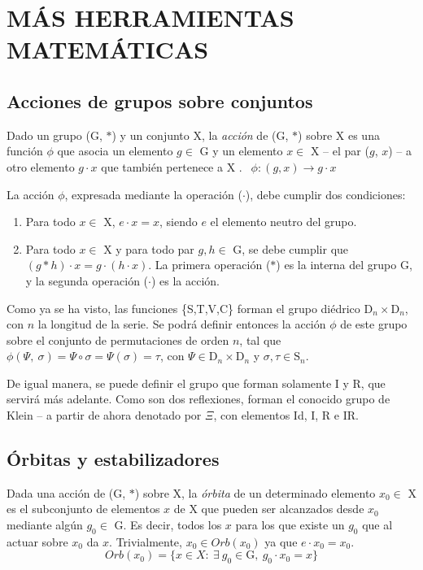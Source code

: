 \section{MÁS HERRAMIENTAS MATEMÁTICAS}\label{ch:acciones}
	\subsection{Acciones de grupos sobre conjuntos}
		Dado un grupo (G, $*$) y un conjunto X, la \emph{acción} de (G, $*$) sobre X es una función $\phi$ que asocia un elemento $g \in$ G y un elemento $x \in$ X -- el par ($g$, $x$) -- a otro elemento $g\cdot x$ que también pertenece a X \cite{armstrong}. $\ \ \phi :(g,x) \to g\cdot x$
	
		La acción $\phi$, expresada mediante la operación ($\cdot$), debe cumplir dos condiciones:
		\begin{enumerate}
			\item{Para todo $x\in$ X, $e\cdot x=x$, siendo $e$ el elemento neutro del grupo.}
		
			\item{Para todo $x\in$ X y para todo par $g,h\in$ G, se debe cumplir que $(g*h)\cdot x=g\cdot (h\cdot x)$. La primera operación ($*$) es la interna del grupo G, y la segunda operación ($\cdot$) es la acción.}
		\end{enumerate}
		Como ya se ha visto, las funciones \{S,T,V,C\} forman el grupo diédrico $\mbox{D}_{n}\times\mbox{D}_{n}$, con $n$ la longitud de la serie. Se podrá definir entonces la acción $\phi$ de este grupo sobre el conjunto de permutaciones de orden $n$, tal que $\phi(\Psi,\ \sigma)=\Psi\circ\sigma=\Psi(\sigma)=\tau$, con $\Psi\in\mbox{D}_{n}\times\mbox{D}_{n}$ y $\sigma,\tau\in\mbox{S}_n$.
		
		De igual manera, se puede definir el grupo que forman solamente I y R, que servirá más adelante. Como son dos reflexiones, forman el conocido grupo de Klein -- a partir de ahora denotado por $\Xi$, con elementos Id, I, R e IR.

	\subsection{Órbitas y estabilizadores}	
		Dada una acción de (G, $*$) sobre X, la \emph{órbita} de un determinado elemento $x_0\in$ X es el subconjunto de elementos $x$ de X que pueden ser alcanzados desde $x_0$ mediante algún $g_0\in$ G. Es decir, todos los $x$ para los que existe un $g_0$ que al actuar sobre $x_0$ da $x$. Trivialmente, $x_0\in Orb(x_0)$ ya que $e\cdot x_0=x_0$.
		\[Orb(x_0)=\{x\in X :\ \exists \ g_0\in \mbox{G},\ g_0\cdot x_0 =x\}\]
	

